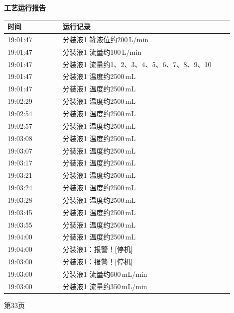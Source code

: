 \documentclass[UTF8,10pt,a4paper,fontset=fandol]{ctexart}
\begin{document}
\noindent
\begin{minipage}[t]{0.47\linewidth}
\centering
\textbf{工艺运行报告}

\vspace{2mm}
\scriptsize
\begin{tabular}{|p{0.22\linewidth}|p{0.68\linewidth}|}
\hline
时间 & 运行记录 \\ \hline
19:01:47 & 分装液1 罐液位约200\,L/min \\ \hline
19:01:47 & 分装液1 流量约100\,L/min \\ \hline
19:01:47 & 分装液1 流量约1、2、3、4、5、6、7、8、9、10 \\ \hline
19:01:47 & 分装液1 温度约2500\,mL \\ \hline
19:01:47 & 分装液1 温度约2500\,mL \\ \hline
19:02:29 & 分装液1 温度约2500\,mL \\ \hline
19:02:54 & 分装液1 温度约2500\,mL \\ \hline
19:02:57 & 分装液1 温度约2500\,mL \\ \hline
19:03:08 & 分装液1 温度约2500\,mL \\ \hline
19:03:07 & 分装液1 温度约2500\,mL \\ \hline
19:03:17 & 分装液1 温度约2500\,mL \\ \hline
19:03:21 & 分装液1 温度约2500\,mL \\ \hline
19:03:24 & 分装液1 温度约2500\,mL \\ \hline
19:03:28 & 分装液1 温度约2500\,mL \\ \hline
19:03:45 & 分装液1 温度约2500\,mL \\ \hline
19:03:55 & 分装液1 温度约2500\,mL \\ \hline
19:04:00 & 分装液1 温度约2500\,mL \\ \hline
19:04:00 & 分装液1：报警！[停机] \\ \hline
19:03:00 & 分装液1：报警！[停机] \\ \hline
19:03:00 & 分装液1 流量约600\,mL/min \\ \hline
19:03:00 & 分装液1 流量约350\,mL/min \\ \hline
\end{tabular}

\vspace{2mm}
第33页
\end{minipage}
\hfill
\end{document}
